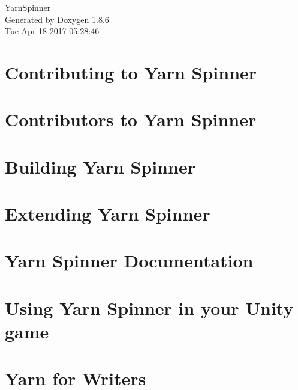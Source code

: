 \documentclass[twoside]{book}
\newcommand{\clearemptydoublepage}{%
  \newpage{\pagestyle{empty}\cleardoublepage}%
}
\begin{document}
\hypersetup{pageanchor=false}
\begin{titlepage}
\vspace*{7cm}
\begin{center}%
{\Large Yarn\-Spinner }\\
\vspace*{1cm}
{\large Generated by Doxygen 1.8.6}\\
\vspace*{0.5cm}
{\small Tue Apr 18 2017 05:28:46}\\
\end{center}
\end{titlepage}
\clearemptydoublepage
\tableofcontents
\clearemptydoublepage
{}
\hypersetup{pageanchor=true}

\chapter{Contributing to Yarn Spinner}
\label{d7/d46/a00002}
\hypertarget{d7/d46/a00002}{}

\chapter{Contributors to Yarn Spinner}
\label{d0/d0b/a00004}
\hypertarget{d0/d0b/a00004}{}

\chapter{Building Yarn Spinner}
\label{de/d21/a00006}
\hypertarget{de/d21/a00006}{}

\chapter{Extending Yarn Spinner}
\label{d4/dee/a00008}
\hypertarget{d4/dee/a00008}{}

\chapter{Yarn Spinner Documentation}
\label{d7/dec/a00010}
\hypertarget{d7/dec/a00010}{}

\chapter{Using Yarn Spinner in your Unity game}
\label{df/d86/a00012}
\hypertarget{df/d86/a00012}{}

\chapter{Yarn for Writers}
\label{d2/de7/a00014}
\hypertarget{d2/de7/a00014}{}

\end{document}
